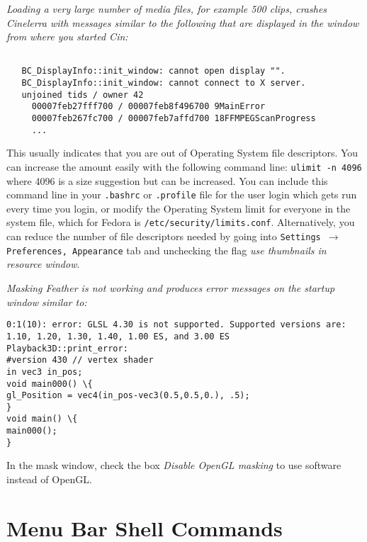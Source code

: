 \textit{ Loading a very large number of media files, for example 500 clips, crashes Cinelerra with messages similar to the following that are displayed in the window from where you started Cin:}

\begin{lstlisting}[numbers=none,xleftmargin=10mm]

   BC_DisplayInfo::init_window: cannot open display "".
   BC_DisplayInfo::init_window: cannot connect to X server.
   unjoined tids / owner 42
     00007feb27fff700 / 00007feb8f496700 9MainError
     00007feb267fc700 / 00007feb7affd700 18FFMPEGScanProgress
     ... 

\end{lstlisting}

This usually indicates that you are out of Operating System file descriptors.  You can increase the amount easily with the following command line:  \texttt{ulimit -n 4096}   where 4096 is a size suggestion but can be increased.  You can include this command line in your \texttt{.bashrc} or \texttt{.profile} file for the user login which gets run every time you login, or modify the Operating System limit for everyone in the system file, which for Fedora is \texttt{/etc/security/limits.conf}.  Alternatively, you can reduce the number of file descriptors needed by going into \texttt{Settings $\rightarrow$ Preferences, Appearance} tab and unchecking the flag \textit{use thumbnails in resource window}.

\bigskip
\textit{Masking Feather is not working and produces error messages on the startup window similar to:}

\begin{lstlisting}[numbers=none,xleftmargin=10mm]
0:1(10): error: GLSL 4.30 is not supported. Supported versions are: 1.10, 1.20, 1.30, 1.40, 1.00 ES, and 3.00 ES
Playback3D::print_error:
#version 430 // vertex shader
in vec3 in_pos;
void main000() \{
gl_Position = vec4(in_pos-vec3(0.5,0.5,0.), .5);
}
void main() \{
main000();
}
\end{lstlisting}

In the mask window, check the box \textit{Disable OpenGL masking} to use software instead of OpenGL.

\section{Menu Bar Shell Commands}%
\label{menu_bar_shell_commands}

